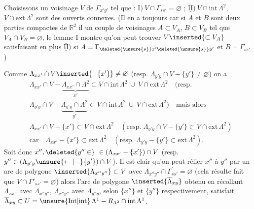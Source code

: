 Choisissons un voisinage $V$ de $\Gamma_{x'y'}$ tel que : $\mathrm{I})\ V\cap\Gamma_{ss'}=\varnothing$ ;
\reversemarginpar\margin{$\vert$}\normalmarginpar\margin{$\vert$}%
$\overline{\underline{\mathrm{II}}})\ V\cap\mathrm{int}\,\Lambda^{2}$, $V\cap\mathrm{ext}\,\Lambda^{2}$ sont des ouverts connexes. (Il  en a toujours car si $A$ et $B$ sont deux parties compactes de $\mathbb{R}^{2}$ il  un couple de voisinages $A\subset V_A$, $B\subset V_B$ tel que $V_A\cap V_B=\varnothing$, le lemme I  montre qu'on peut trouver $V\inserted{\subset V_A}$ satisfaisant en plus $\overline{\underline{\mathrm{II}}})$ si $A=\Gamma_{\deleted{\unsure{s}}x'\deleted{\unsure{s}}y'}$ et $B=\Gamma_{ss'}$)

Comme $\Lambda_{xx'}\cap V\inserted{-\{x'\}}\ne\varnothing$  (resp. $\Lambda_{y'y}\cap V-\{y'\}\ne\varnothing$) on a
\[
\begin{aligned}
&\Lambda_{xx'}\cap V-\underbrace{\Lambda_{xx'}\cap\Lambda^{2}}_{x'}\subset V\cap\mathrm{int}\,\Lambda^{2}\ \cup\ V\cap\mathrm{ext}\,\Lambda^{2}\quad(\text{resp.}\\
&\Lambda_{y'y}\cap V-\underbrace{\Lambda_{y'y}\cap\Lambda^{2}}_{y'}\subset V\cap\mathrm{int}\,\Lambda^{2}\ \cup\ V\cap\mathrm{ext}\,\Lambda^{2})\quad\text{mais alors}\\
&\Lambda_{xx'}\cap V-\{x'\}\subset V\cap\mathrm{ext}\,\Lambda^{2}\quad(\text{resp. }\Lambda_{y'y}\cap V-\{y'\}\subset V\cap\mathrm{ext}\,\Lambda^{2})\\
&\text{car}\quad \Lambda_{xx'}-\{x'\}\subset\mathrm{ext}\,\Lambda^{2}\quad(\text{resp. }\Lambda_{y'y}-\{y'\}\subset\mathrm{ext}\,\Lambda^{2}).
\end{aligned}
\]
Soit donc $x'',\deleted{y''\in}\ \in(\Lambda_{xx'}-\{x'\})\cap V$ (resp. $y''\in(\Lambda_{y'y}\unsure{\leftarrow|-}\{y'\})\cap V$).
Il est clair qu'on peut rélier $x''$ à $y''$ par un arc de polygone $\inserted{\Lambda_{x''y''}}\subset V$ avec $\Lambda_{x''y''}\cap\Gamma^{\prime}_{ss'}=\varnothing$ (cela résulte  fait que $V\cap\Gamma'_{ss'}=\varnothing$) alors l'arc de polygone $\inserted{\overline{\Lambda}_{xy}}$ obtenu
\reversemarginpar\margin{$\vert$}\normalmarginpar\margin{$\vert$}%
en récollant $\Lambda_{xx''}$ avec $\Lambda_{x''y''}$, $\Lambda_{x''y''}$ avec $\Lambda_{y''y}$, selon $\{x''\}$ et $\{y''\}$ respectivement, satisfait $\overline{\Lambda}_{x\dot y}\subset U=\unsure{\mathrm{Int}|\mathrm{int}}\,\Lambda^{1}-R_{\Lambda^{2}}\cap\mathrm{int}\,\Lambda^{1}$.

